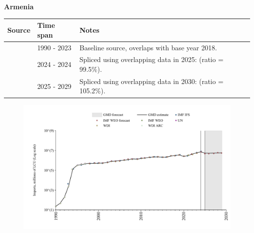 \documentclass[12pt,a4paper,landscape]{article}
\begin{document}
\begin{adjustbox}{max totalsize={\paperwidth}{\paperheight},center}
\begin{minipage}[t][\textheight][t]{\textwidth}
\vspace*{0.5cm}
{}
\begin{center}
{\Large\bfseries Armenia}
\end{center}
\vspace{0.5cm}
\begin{table}[H]
\centering
\small
\begin{tabular}{|l|l|l|}
\hline
\textbf{Source} & \textbf{Time span} & \textbf{Notes} \\
\hline
\rowcolor{white}\cite{WDI}& 1990 - 2023 &Baseline source, overlaps with base year 2018.\\
\rowcolor{lightgray}\cite{IMF_IFS}& 2024 - 2024 &Spliced using overlapping data in 2025: (ratio = 99.5\%).\\
\rowcolor{white}\cite{IMF_WEO_forecast}& 2025 - 2029 &Spliced using overlapping data in 2030: (ratio = 105.2\%).\\
\hline
\end{tabular}
\end{table}
\begin{figure}[H]
\centering
\includegraphics[width=\textwidth,height=0.6\textheight,keepaspectratio]{graphs/ARM_imports.pdf}
\end{figure}
\end{minipage}
\end{adjustbox}
\end{document}
